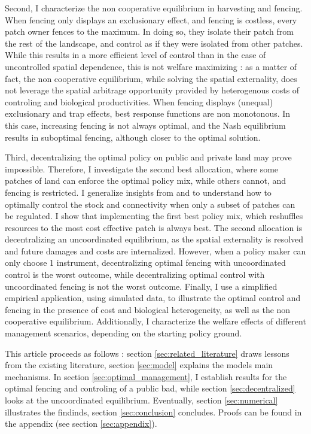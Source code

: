 Second, I characterize the non cooperative equilibrium in harvesting and fencing. When fencing only displays an exclusionary effect, and fencing is costless, every patch owner fences to the maximum. In doing so, they isolate their patch from the rest of the landscape, and control as if they were isolated from other patches. While this results in a more efficient level of control than in the case of uncontrolled spatial dependence, this is not welfare maximizing : as a matter of fact, the non cooperative equilibrium, while solving the spatial externality, does not leverage the spatial arbitrage opportunity provided by heterogenous costs of controling and biological productivities. When fencing displays (unequal) exclusionary and trap effects, best response functions are non monotonous. In this case, increasing fencing is not always optimal, and the Nash equilibrium results in suboptimal fencing, although closer to the optimal solution.

Third, decentralizing the optimal policy on public and private land may prove impossible. Therefore, I investigate the second best allocation, where some patches of land can enforce the optimal policy mix, while others cannot, and fencing is restricted. I generalize insights from \cite{costello_optimal_2008} and \cite{costello_private_2017} to understand how to optimally control the stock and connectivity when only a subset of patches can be regulated. I show that implementing the first best policy mix, which reshuffles resources to the most cost effective patch is always best. The second allocation is decentralizing an uncoordinated equilibrium, as the spatial externality is resolved and future damages and costs are internalized. However, when a policy maker can only choose 1 instrument, decentralizing optimal fencing with uncoordinated control is the worst outcome, while decentralizing optimal control with uncoordinated fencing is not the worst outcome. Finally, I use a simplified empirical application, using simulated data, to illustrate the optimal control and fencing in the presence of cost and biological heterogeneity, as well as the non cooperative equilibrium. Additionally, I characterize the welfare effects of different management scenarios, depending on the starting policy ground. 

This article proceeds as follows : section \ref{sec:related_literature} draws lessons from the existing literature, section \ref{sec:model} explains the models main mechanisms. In section \ref{sec:optimal_management}, I establish results for the optimal fencing and controling of a public bad, while section \ref{sec:decentralized} looks at the uncoordinated equilibrium. Eventually, section \ref{sec:numerical} illustrates the findinds, section \ref{sec:conclusion} concludes. Proofs can be found in the appendix (see section \ref{sec:appendix}).

